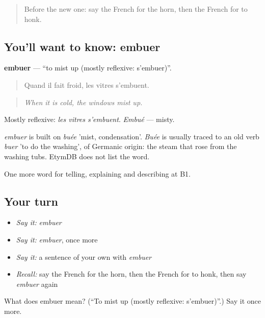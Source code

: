 \label{lesson:FR-C402-embuer}



\begin{quote}
Before the new one: say the French for the horn, then the French for to honk.
\end{quote}

\subsection*{You'll want to know: embuer}
\textbf{embuer} — \textquotedblleft{}to mist up (mostly reflexive: s’embuer)\textquotedblright{}.

\begin{quote}
Quand il fait froid, les vitres s'embuent.
\end{quote}

\begin{quote}
\emph{When it is cold, the windows mist up.}
\end{quote}

Mostly reflexive: \emph{les vitres s'embuent}. \emph{Embué} — misty.

\begin{cousinweb}
\emph{embuer} is built on \emph{buée} 'mist, condensation'. \emph{Buée} is usually traced to an old verb \emph{buer} 'to do the washing', of Germanic origin: the steam that rose from the washing tubs. EtymDB does not list the word.
\end{cousinweb}

\begin{grammarlens}[title={What you've built}]
One more word for telling, explaining and describing at B1.
\end{grammarlens}

\subsection*{Your turn}
\begin{itemize}
\raggedright
  \item \emph{Say it:} \emph{embuer}
  \item \emph{Say it:} \emph{embuer}, once more
  \item \emph{Say it:} a sentence of your own with \emph{embuer}
  \item \emph{Recall:} say the French for the horn, then the French for to honk, then say \emph{embuer} again
\end{itemize}

\begin{tcolorbox}[breakable,colback=teal!4,colframe=teal!35!black,title={Before you move on}]
What does embuer mean? (\textquotedblleft{}To mist up (mostly reflexive: s’embuer)\textquotedblright{}.) Say it once more.
\end{tcolorbox}
